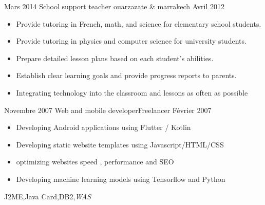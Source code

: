 %
%
%

\begin{experiences}

  \experience
    {Mars 2014}     {School support teacher} %
    {ouarzazate \& marrakech}{}
    {Avril 2012}    {
                      \begin{itemize}
                        \item Provide tutoring in French, math, and science for elementary school students.
                            \item Provide tutoring in physics and computer science for university students.
                        \item Prepare detailed lesson plans based on each student's abilities.
                        \item Establish clear learning goals and provide progress reports to parents.			
                      \item Integrating technology into the classroom and lessons as often as possible
                        
                      \end{itemize}}
                    {}
  \emptySeparator       
  \experience
  {Novembre 2007}  { Web and mobile developer}{Freelancer}{}
  {Février 2007}   {
                      \begin{itemize}
                        \item {Developing Android  applications using Flutter / Kotlin}
                        \item {Developing static website templates using Javascript/HTML/CSS}
                        \item {optimizing websites speed , performance and SEO}
                        \item {Developing machine learning models using Tensorflow and Python}                     
                      \end{itemize}
                  }
                  {J2ME,Java Card,DB2,\emph{WAS}}  
\end{experiences}
